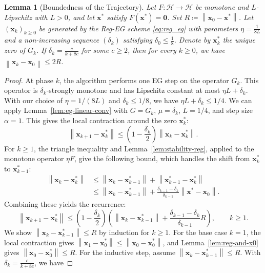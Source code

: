 \documentclass[letterpaper,11pt]{article}
\newcommand{\norm}[1]{\left\| #1 \right\|}
\newcommand{\vect}[1]{\mathbf{#1}}
\newtheorem{lemma}{Lemma}
\begin{document}
\begin{lemma}[Boundedness of the Trajectory]\label{lem:traj-bound}
Let \(F:\mathcal H\to\mathcal H\) be monotone and \(L\)-Lipschitz with \(L>0\), and let \(\vect{x}^*\) satisfy \(F(\vect{x}^*)=\vect{0}\). Set \(R\coloneqq\norm{\vect{x}_0-\vect{x}^*}\). Let \((\vect{x}_k)_{k\ge0}\) be generated by the Reg-EG scheme \eqref{eq:reg_eg} with parameters \(\eta=\frac{1}{8L}\) and a non-increasing sequence \((\delta_k)\) satisfying \(\delta_0 \le \frac{1}{8}\). Denote by \(\vect{x}_k^*\) the unique zero of \(G_k\). If \(\delta_k = \frac{c}{k+8c}\) for some \(c \ge 2\), then for every \(k\ge0\), we have \(\norm{\vect{x}_k - \vect{x}_0} \le 2R\).
\end{lemma}
\begin{proof}
At phase \(k\), the algorithm performs one EG step on the operator \(G_k\). This operator is \(\delta_k\)-strongly monotone and has Lipschitz constant at most \(\eta L+\delta_k\). With our choice of \(\eta = 1/(8L)\) and \(\delta_k \le 1/8\), we have \(\eta L+\delta_k \le 1/4\). We can apply Lemma~\ref{lem:eg-linear-conv} with \(G=G_k\), \(\mu=\delta_k\), \(\bar L=1/4\), and step size \(\alpha=1\). This gives the local contraction around the zero \(\vect{x}_k^*\):
\[
    \norm{\vect{x}_{k+1} - \vect{x}_k^*}
    \le
    \left(1-\frac{\delta_k}{2}\right)
    \norm{\vect{x}_k - \vect{x}_k^*}.
\]
For \(k\ge1\), the triangle inequality and Lemma~\ref{lem:stability-reg},
applied to the monotone operator \(\eta F\), give the following bound, which
handles the shift from \(\vect{x}_k^*\) to \(\vect{x}_{k-1}^*\):
\begin{align*}
    \norm{\vect{x}_k - \vect{x}_k^*} &\le \norm{\vect{x}_k - \vect{x}_{k-1}^*} + \norm{\vect{x}_{k-1}^* - \vect{x}_k^*} \\
    &\le \norm{\vect{x}_k - \vect{x}_{k-1}^*} + \frac{\delta_{k-1}-\delta_k}{\delta_{k-1}} \norm{\vect{x}^*-\vect{x}_0}.
\end{align*}
Combining these yields the recurrence:
\[
    \norm{\vect{x}_{k+1} - \vect{x}_k^*} \le \left(1 - \frac{\delta_k}{2}\right) \left(\norm{\vect{x}_k - \vect{x}_{k-1}^*} + \frac{\delta_{k-1} - \delta_k}{\delta_{k-1}} R \right),\qquad k\ge1.
\]
We show \(\norm{\vect{x}_k - \vect{x}_{k-1}^*} \le R\) by induction for \(k\ge1\). For the base case \(k=1\), the local contraction gives \(\norm{\vect{x}_1-\vect{x}_0^*}\le\norm{\vect{x}_0-\vect{x}_0^*}\), and Lemma~\ref{lem:reg-and-x0} gives \(\norm{\vect{x}_0-\vect{x}_0^*}\le R\). For the inductive step, assume \(\norm{\vect{x}_k - \vect{x}_{k-1}^*} \le R\). With \(\delta_k = \frac{c}{k+8c}\), we have

\end{proof}
\end{document}

